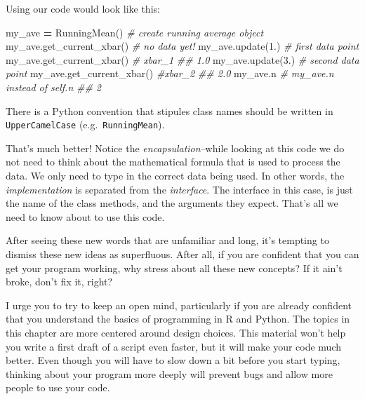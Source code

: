 \documentclass[12pt,krantz2]{krantz}
\makeatletter
\newenvironment{Shaded}{\begin{snugshade}}{\end{snugshade}}
\newcommand{\CommentTok}[1]{\textcolor[rgb]{0.37,0.37,0.37}{\textit{#1}}}
\newcommand{\FloatTok}[1]{\textcolor[rgb]{0.06,0.06,0.06}{#1}}
\newcommand{\NormalTok}[1]{#1}
\newcommand{\OperatorTok}[1]{\textcolor[rgb]{0.43,0.43,0.43}{\textbf{#1}}}
\newenvironment{kframe}{%
\medskip{}
\setlength{\fboxsep}{.8em}
 \def\at@end@of@kframe{}%
 \ifinner\ifhmode%
  \def\at@end@of@kframe{\end{minipage}}%
  \begin{minipage}{\columnwidth}%
 \fi\fi%
 \def\FrameCommand##1{\hskip\@totalleftmargin \hskip-\fboxsep
 \colorbox{shadecolor}{##1}\hskip-\fboxsep
     \hskip-\linewidth \hskip-\@totalleftmargin \hskip\columnwidth}%
 \MakeFramed {\advance\hsize-\width
   \@totalleftmargin\z@ \linewidth\hsize
   \@setminipage}}%
 {\par\unskip\endMakeFramed%
 \at@end@of@kframe}
\renewenvironment{Shaded}{\begin{kframe}}{\end{kframe}}
\makeatother
\begin{document}
Using our code would look like this:

\begin{Shaded}
\begin{Highlighting}[]
\NormalTok{my_ave }\OperatorTok{=}\NormalTok{ RunningMean() }\CommentTok{# create running average object}
\NormalTok{my_ave.get_current_xbar() }\CommentTok{# no data yet!}
\NormalTok{my_ave.update(}\FloatTok{1.}\NormalTok{) }\CommentTok{# first data point}
\NormalTok{my_ave.get_current_xbar() }\CommentTok{# xbar_1}
\CommentTok{## 1.0}
\NormalTok{my_ave.update(}\FloatTok{3.}\NormalTok{)  }\CommentTok{# second data point}
\NormalTok{my_ave.get_current_xbar()  }\CommentTok{#xbar_2}
\CommentTok{## 2.0}
\NormalTok{my_ave.n   }\CommentTok{# my_ave.n instead of self.n}
\CommentTok{## 2}
\end{Highlighting}
\end{Shaded}

\begin{rmd-details}
There is a Python convention that stipules class names should be written in \texttt{UpperCamelCase} (e.g.~\texttt{RunningMean}).

\end{rmd-details}

That's much better! Notice the \emph{encapsulation}--while looking at this code we do not need to think about the mathematical formula that is used to process the data. We only need to type in the correct data being used. In other words, the \emph{implementation} is separated from the \emph{interface}. The interface in this case, is just the name of the class methods, and the arguments they expect. That's all we need to know about to use this code.

\begin{rmd-caution}
After seeing these new words that are unfamiliar and long, it's tempting to dismiss these new ideas as superfluous. After all, if you are confident that you can get your program working, why stress about all these new concepts? If it ain't broke, don't fix it, right?

I urge you to try to keep an open mind, particularly if you are already confident that you understand the basics of programming in R and Python. The topics in this chapter are more centered around design choices. This material won't help you write a first draft of a script even faster, but it will make your code much better. Even though you will have to slow down a bit before you start typing, thinking about your program more deeply will prevent bugs and allow more people to use your code.

\end{rmd-caution}
\end{document}
